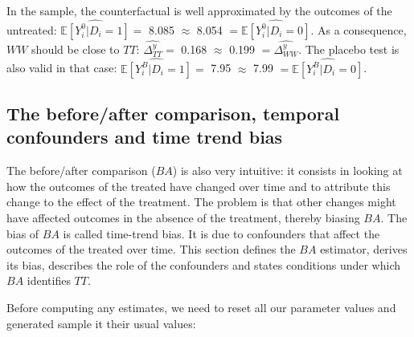 \documentclass[]{book}
\newcommand{\esp}[1]{\mathbb{E}[ #1 ]}
\theoremstyle{definition}
\theoremstyle{definition}
\theoremstyle{definition}
\theoremstyle{remark}
\let\BeginKnitrBlock\begin \let\EndKnitrBlock\end
\begin{document}
In the sample, the counterfactual is well approximated by the outcomes
of the untreated: \(\hat{\esp{Y_i^0|D_i=1}}=\) 8.085 \(\approx\) 8.054
\(=\hat{\esp{Y_i^0|D_i=0}}\). As a consequence, \(WW\) should be close
to \(TT\): \(\hat{\Delta^y_{TT}}=\) 0.168 \(\approx\) 0.199
\(=\hat{\Delta^y_{WW}}\). The placebo test is also valid in that case:
\(\hat{\esp{Y_i^B|D_i=1}}=\) 7.95 \(\approx\) 7.99
\(=\hat{\esp{Y_i^B|D_i=0}}\).

\subsection{The before/after comparison, temporal confounders and time
trend
bias}\label{the-beforeafter-comparison-temporal-confounders-and-time-trend-bias}

The before/after comparison (\(BA\)) is also very intuitive: it consists
in looking at how the outcomes of the treated have changed over time and
to attribute this change to the effect of the treatment. The problem is
that other changes might have affected outcomes in the absence of the
treatment, thereby biasing \(BA\). The bias of \(BA\) is called
time-trend bias. It is due to confounders that affect the outcomes of
the treated over time. This section defines the \(BA\) estimator,
derives its bias, describes the role of the confounders and states
conditions under which \(BA\) identifies \(TT\).

\BeginKnitrBlock{example}
\protect\hypertarget{exm:unnamed-chunk-23}{}{\label{exm:unnamed-chunk-23}
}Before computing any estimates, we need to reset all our parameter
values and generated sample it their usual values:
\EndKnitrBlock{example}
\end{document}
